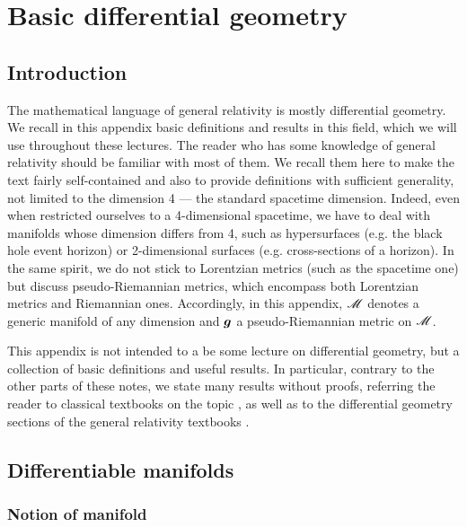 \chapter{Basic differential geometry} \label{s:bas}

\minitoc

\section{Introduction}

The mathematical language of general relativity is mostly differential geometry.
We recall in this appendix basic definitions and results in this field, which we will use
throughout these lectures. The reader who has some knowledge of general relativity should be familiar with most of them. We recall them here to make the text fairly self-contained and also to provide definitions with sufficient generality, not limited to the dimension 4 --- the standard spacetime dimension. Indeed, even when restricted ourselves to
a 4-dimensional spacetime, we have to deal with manifolds whose dimension differs from 4,
such as hypersurfaces (e.g. the black hole event horizon) or 2-dimensional surfaces
(e.g.  cross-sections of a horizon).
In the same spirit, we do not stick to Lorentzian metrics
(such as the spacetime one) but discuss pseudo-Riemannian metrics, which
encompass both Lorentzian metrics and Riemannian ones.
Accordingly, in this appendix, $\mathscr{M}$ denotes a generic manifold of any dimension
and $\bm{g}$ a pseudo-Riemannian metric on $\mathscr{M}$.

This appendix is not intended to a be some lecture on differential geometry, but
a collection of basic definitions and useful results. In particular,
contrary to the other parts of these notes, we state many results without proofs,
referring the reader to classical textbooks on the topic
\cite{Lafon15,Lee97,Lee13,ONeil83,Berge03,ChoquDD77,Eschr11}, as well as
to the differential geometry sections of the general relativity textbooks
\cite{Choqu09,Strau04,Wald84}.


\section{Differentiable manifolds} \label{s:bas:manif}

\subsection{Notion of manifold} \label{s:bas:def_manif}

